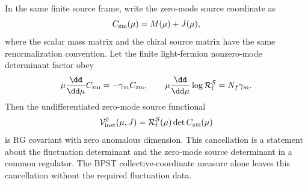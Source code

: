 \begin{construction}
\label{constr:instanton-mass-source-rg-channel-transport}
In the same finite source frame, write the zero-mode source coordinate as
\[
  C_{\rm zm}(\mu)=M(\mu)+J(\mu),
\]
where the scalar mass matrix and the chiral source matrix have the same
renormalization convention.  Let the finite light-fermion nonzero-mode
determinant factor obey
\begin{equation}
  \mu\frac{\dd}{\dd\mu}C_{\rm zm}=-\gamma_m C_{\rm zm},
  \qquad
  \mu\frac{\dd}{\dd\mu}\log \mathcal R_{\rm f}^{\mathcal S}
  =N_f\gamma_m .
  \label{eq:instanton-mass-source-rg-zero-mode-flow}
\end{equation}
Then the undifferentiated zero-mode source functional
\begin{equation}
  \mathcal V_{\rm inst}^{0}(\mu,J)
  =
  \mathcal R_{\rm f}^{\mathcal S}(\mu)\det C_{\rm zm}(\mu)
  \label{eq:instanton-source-functional-rg-invariance}
\end{equation}
is RG covariant with zero anomalous dimension.  This cancellation is a
statement about the fluctuation determinant and the zero-mode source
determinant in a common regulator.  The BPST collective-coordinate measure
alone leaves this cancellation without the required fluctuation data.


\end{construction}
